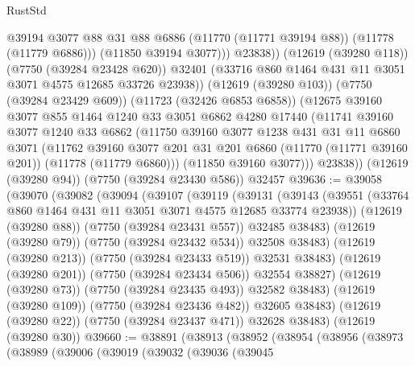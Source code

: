 \begin{lexlean}{RustStd}
\begin{coremodule}
                  @39194
                  @3077
                  @88
                  @31
                  @88
                  @6886
                  (@11770 (@11771 @39194 @88))
                  (@11778 (@11779 @6886)))
                (@11850 @39194 @3077)))
            @23838))
        (@12619 (@39280 @118))
        (@7750 (@39284 @23428 @620))
        @32401
        (@33716 @860 @1464 @431 @11 @3051 @3071 @4575 @12685 @33726 @23938))
      (@12619 (@39280 @103))
      (@7750 (@39284 @23429 @609))
      (@11723 (@32426 @6853 @6858))
      (@12675
        @39160
        @3077
        @855
        @1464
        @1240
        @33
        @3051
        @6862
        @4280
        @17440
        (@11741
          @39160
          @3077
          @1240
          @33
          @6862
          (@11750
            @39160
            @3077
            @1238
            @431
            @31
            @11
            @6860
            @3071
            (@11762
              @39160
              @3077
              @201
              @31
              @201
              @6860
              (@11770 (@11771 @39160 @201))
              (@11778 (@11779 @6860)))
            (@11850 @39160 @3077)))
        @23838))
    (@12619 (@39280 @94))
    (@7750 (@39284 @23430 @586))
    @32457
@39636 := @39058
    (@39070
      (@39082
        (@39094
          (@39107
            (@39119
              (@39131
                (@39143
                  (@39551 (@33764 @860 @1464 @431 @11 @3051 @3071 @4575 @12685 @33774 @23938))
                  (@12619 (@39280 @88))
                  (@7750 (@39284 @23431 @557))
                  @32485
                  @38483)
                (@12619 (@39280 @79))
                (@7750 (@39284 @23432 @534))
                @32508
                @38483)
              (@12619 (@39280 @213))
              (@7750 (@39284 @23433 @519))
              @32531
              @38483)
            (@12619 (@39280 @201))
            (@7750 (@39284 @23434 @506))
            @32554
            @38827)
          (@12619 (@39280 @73))
          (@7750 (@39284 @23435 @493))
          @32582
          @38483)
        (@12619 (@39280 @109))
        (@7750 (@39284 @23436 @482))
        @32605
        @38483)
      (@12619 (@39280 @22))
      (@7750 (@39284 @23437 @471))
      @32628
      @38483)
    (@12619 (@39280 @30))
@39660 := @38891
    (@38913
      (@38952
        (@38954
          (@38956
            (@38973
              (@38989
                (@39006
                  (@39019
                    (@39032
                      (@39036
                        (@39045

\end{coremodule}
\end{lexlean}
